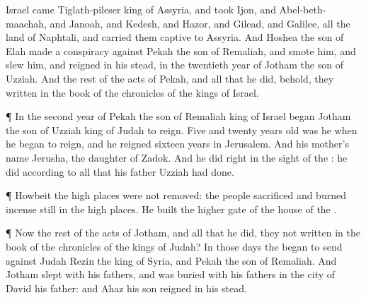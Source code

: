 {Israel
came
Tiglath-pileser
king of
Assyria, and
took
Ijon, and
Abel-beth-maachah, and
Janoah, and
Kedesh, and
Hazor, and
Gilead, and
Galilee, all the
land of
Naphtali, and carried them
captive to
Assyria.
And
Hoshea the
son of
Elah
made a
conspiracy against
Pekah the
son of
Remaliah, and
smote him, and
slew him, and
reigned in his stead, in the
twentieth
year of
Jotham the
son of
Uzziah.
And the
rest of the
acts of
Pekah, and all that he
did, behold, they
{}
written in the
book of the
chronicles of the
kings of
Israel.
\par }{\PP {}¶ In the
second
year of
Pekah the
son of
Remaliah
king of
Israel began
Jotham the
son of
Uzziah
king of
Judah to
reign.
Five and
twenty
years
old was he when he began to
reign, and he
reigned
sixteen
years in
Jerusalem. And his
mother’s
name
{}
Jerusha, the
daughter of
Zadok.
And he
did
{}
right in the
sight of the
{}: he
did according to all that his
father
Uzziah had
done.
\par }{\PP {}¶ Howbeit the high
places were not
removed: the
people
sacrificed and burned
incense still in the high
places. He
built the
higher
gate of the
house of the
{}.
\par }{\PP {}¶ Now the
rest of the
acts of
Jotham, and all that he
did,
{} they not
written in the
book of the
chronicles of the
kings of
Judah?
In those
days the
{}
began to
send against
Judah
Rezin the
king of
Syria, and
Pekah the
son of
Remaliah.
And
Jotham
slept with his
fathers, and was
buried with his
fathers in the
city of
David his
father: and
Ahaz his
son
reigned in his stead.

}
